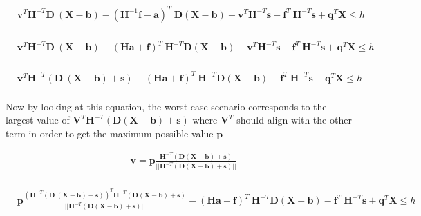 \documentclass[12pt]{article}
\begin{document}
\begin{equation}
\begin{aligned}
& \mathbf{v}^T \mathbf{H}^{-T} \mathbf{D}\ (\mathbf{X}-\mathbf{b})-(\mathbf{H}^{-1}\mathbf{f}-\mathbf{a})^T\ \mathbf{D}(\mathbf{X}-\mathbf{b})+\mathbf{v}^T\mathbf{H}^{-T}\mathbf{s}-\mathbf{f}^T\ \mathbf{H}^{-T}\mathbf{s}+\mathbf{q}^T\mathbf{X} \leq h  \\
\end{aligned}
\end{equation}



\begin{equation}
\begin{aligned}
& \mathbf{v}^T \mathbf{H}^{-T} \mathbf{D}\ (\mathbf{X}-\mathbf{b})-(\mathbf{H}\mathbf{a}+\mathbf{f})^T\ \mathbf{H}^{-T}\mathbf{D}(\mathbf{X}-\mathbf{b})+\mathbf{v}^T\mathbf{H}^{-T}\mathbf{s}-\mathbf{f}^T\ \mathbf{H}^{-T}\mathbf{s}+\mathbf{q}^T\mathbf{X} \leq h  \\
\end{aligned}
\end{equation}


\begin{equation}
\begin{aligned}
& \mathbf{v}^T \mathbf{H}^{-T} (\mathbf{D}\ (\mathbf{X}-\mathbf{b})+\mathbf{s})-(\mathbf{H}\mathbf{a}+\mathbf{f})^T\ \mathbf{H}^{-T}\mathbf{D}(\mathbf{X}-\mathbf{b})-\mathbf{f}^T\ \mathbf{H}^{-T}\mathbf{s}+\mathbf{q}^T\mathbf{X} \leq h  \\
\end{aligned}
\end{equation}


Now by looking at this equation, the worst case scenario corresponds to the largest value of $\mathbf{V}^T  \mathbf{H}^{-T} (\mathbf{D} (\mathbf{X}-\mathbf{b})+\mathbf{s})$ 
where $\mathbf{V}^T$ should align with the other term in order to get the maximum possible value $\mathbf{p}$


\begin{equation}
\begin{aligned}
& \mathbf{v} = \mathbf{p} \frac{\mathbf{H}^{-T}(\mathbf{D}(\mathbf{X}-\mathbf{b})+\mathbf{s})}{||\mathbf{H}^{-T}(\mathbf{D}(\mathbf{X}-\mathbf{b})+\mathbf{s})||} \\
\end{aligned}
\end{equation}

\begin{equation}
\begin{aligned}
&\mathbf{p} \frac{(\mathbf{H}^{-T} (\mathbf{D}\ (\mathbf{X}-\mathbf{b})+\mathbf{s}))^T\mathbf{H}^{-T}(\mathbf{D}(\mathbf{X}-\mathbf{b})+\mathbf{s}) }
{||\mathbf{H}^{-T}(\mathbf{D}(\mathbf{X}-\mathbf{b})+\mathbf{s})||}-(\mathbf{H}\mathbf{a}+\mathbf{f})^T\ \mathbf{H}^{-T}\mathbf{D}(\mathbf{X}-\mathbf{b})-\mathbf{f}^T\ \mathbf{H}^{-T}\mathbf{s}+\mathbf{q}^T\mathbf{X} \leq h  \\ 
\end{aligned}
\end{equation}
\end{document}
